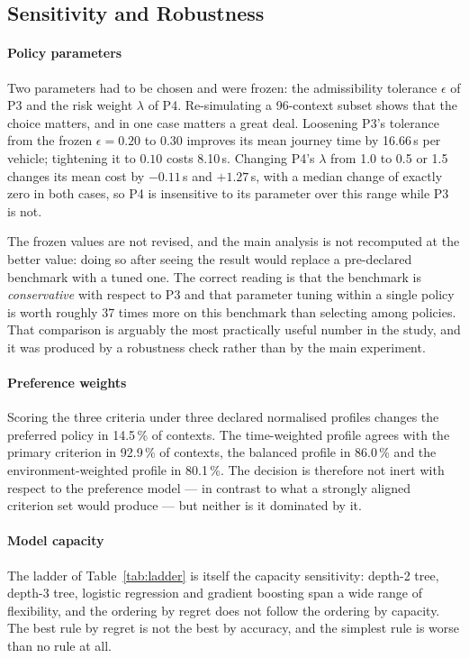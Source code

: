 \subsection{Sensitivity and Robustness}
\label{sec:robust}

\paragraph{Policy parameters} Two parameters had to be chosen and were frozen:
the admissibility tolerance $\epsilon$ of P3 and the risk weight $\lambda$ of P4.
Re-simulating a 96-context subset shows that the choice matters, and in one case
matters a great deal. Loosening P3's tolerance from the frozen $\epsilon=0.20$ to
$0.30$ improves its mean journey time by 16.66\,s per vehicle; tightening it to
$0.10$ costs 8.10\,s. Changing P4's $\lambda$ from 1.0 to 0.5 or 1.5 changes its
mean cost by $-0.11$\,s and $+1.27$\,s, with a median change of exactly zero in
both cases, so P4 is insensitive to its parameter over this range while P3 is not.

The frozen values are not revised, and the main analysis is not recomputed at the
better value: doing so after seeing the result would replace a pre-declared
benchmark with a tuned one. The correct reading is that the benchmark is
\emph{conservative} with respect to P3 and that parameter tuning within a single
policy is worth roughly 37 times more on this benchmark than selecting among
policies. That comparison is arguably the most practically useful number in the
study, and it was produced by a robustness check rather than by the main
experiment.

\paragraph{Preference weights} Scoring the three criteria under three declared
normalised profiles changes the preferred policy in 14.5\,\% of contexts. The
time-weighted profile agrees with the primary criterion in 92.9\,\% of contexts,
the balanced profile in 86.0\,\% and the environment-weighted profile in 80.1\,\%.
The decision is therefore not inert with respect to the preference model --- in
contrast to what a strongly aligned criterion set would produce --- but neither is
it dominated by it.

\paragraph{Model capacity} The ladder of Table~\ref{tab:ladder} is itself the
capacity sensitivity: depth-2 tree, depth-3 tree, logistic regression and
gradient boosting span a wide range of flexibility, and the ordering by regret
does not follow the ordering by capacity. The best rule by regret is not the best
by accuracy, and the simplest rule is worse than no rule at all.
